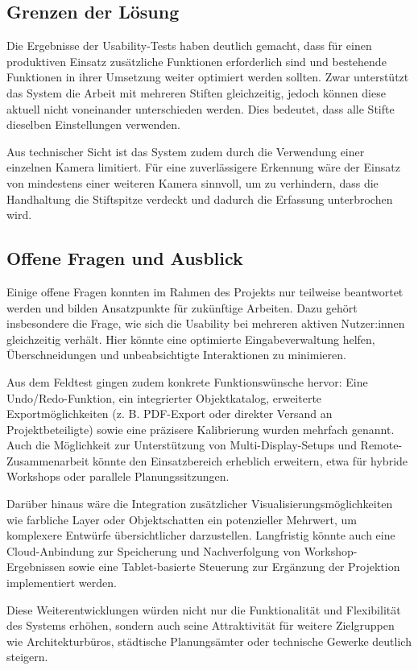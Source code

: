 \subsection{Grenzen der Lösung}

Die Ergebnisse der Usability-Tests haben deutlich gemacht, dass für einen produktiven Einsatz zusätzliche Funktionen erforderlich sind und bestehende Funktionen in ihrer Umsetzung weiter optimiert werden sollten.  
Zwar unterstützt das System die Arbeit mit mehreren Stiften gleichzeitig, jedoch können diese aktuell nicht voneinander unterschieden werden. Dies bedeutet, dass alle Stifte dieselben Einstellungen verwenden.  

Aus technischer Sicht ist das System zudem durch die Verwendung einer einzelnen Kamera limitiert.  
Für eine zuverlässigere Erkennung wäre der Einsatz von mindestens einer weiteren Kamera sinnvoll, um zu verhindern, dass die Handhaltung die Stiftspitze verdeckt und dadurch die Erfassung unterbrochen wird.

\clearpage

\subsection{Offene Fragen und Ausblick}

Einige offene Fragen konnten im Rahmen des Projekts nur teilweise beantwortet werden und bilden Ansatzpunkte für zukünftige Arbeiten.  
Dazu gehört insbesondere die Frage, wie sich die Usability bei mehreren aktiven Nutzer:innen gleichzeitig verhält.  
Hier könnte eine optimierte Eingabeverwaltung helfen, Überschneidungen und unbeabsichtigte Interaktionen zu minimieren.

Aus dem Feldtest gingen zudem konkrete Funktionswünsche hervor:  
Eine Undo/Redo-Funktion, ein integrierter Objektkatalog, erweiterte Exportmöglichkeiten (z. B. PDF-Export oder direkter Versand an Projektbeteiligte) sowie eine präzisere Kalibrierung wurden mehrfach genannt.  
Auch die Möglichkeit zur Unterstützung von Multi-Display-Setups und Remote-Zusammenarbeit könnte den Einsatzbereich erheblich erweitern, etwa für hybride Workshops oder parallele Planungssitzungen.  

Darüber hinaus wäre die Integration zusätzlicher Visualisierungsmöglichkeiten wie farbliche Layer oder Objektschatten ein potenzieller Mehrwert,  
um komplexere Entwürfe übersichtlicher darzustellen.  
Langfristig könnte auch eine Cloud-Anbindung zur Speicherung und Nachverfolgung von Workshop-Ergebnissen sowie eine Tablet-basierte Steuerung  
zur Ergänzung der Projektion implementiert werden.  

Diese Weiterentwicklungen würden nicht nur die Funktionalität und Flexibilität des Systems erhöhen,  
sondern auch seine Attraktivität für weitere Zielgruppen wie Architekturbüros, städtische Planungsämter oder technische Gewerke deutlich steigern.

